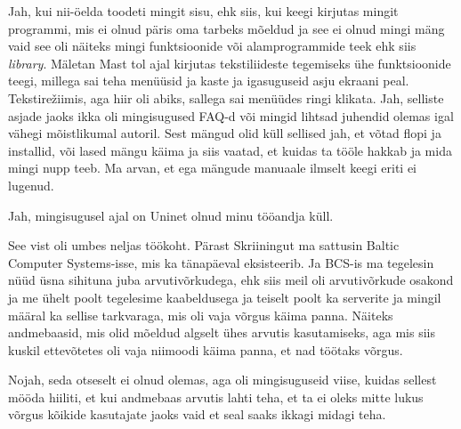 Jah, kui nii-öelda toodeti mingit sisu, ehk siis, kui keegi kirjutas mingit 
programmi, mis ei olnud  päris oma tarbeks mõeldud ja see ei olnud mingi mäng 
vaid see oli näiteks mingi funktsioonide või alamprogrammide teek ehk siis 
\emph{library}. Mäletan Mast tol ajal kirjutas 
tekstiliideste tegemiseks ühe funktsioonide teegi, millega sai teha menüüsid ja 
kaste ja igasuguseid asju ekraani peal. Tekstirežiimis, aga hiir oli  abiks, 
sallega sai menüüdes ringi klikata. Jah, selliste asjade jaoks ikka oli 
mingisugused FAQ-d või mingid lihtsad juhendid olemas igal vähegi mõistlikumal 
autoril. Sest mängud olid küll sellised jah, et võtad flopi ja installid, või 
lased mängu käima ja siis vaatad, et kuidas ta tööle hakkab ja mida mingi nupp 
teeb. Ma arvan, et ega mängude manuaale ilmselt keegi eriti ei lugenud.


Jah, mingisugusel ajal on Uninet  olnud minu tööandja küll.


See vist oli umbes neljas töökoht. Pärast Skriiningut ma sattusin Baltic 
Computer Systems-isse, mis ka tänapäeval 
eksisteerib. Ja BCS-is ma tegelesin  nüüd üsna sihituna juba arvutivõrkudega, 
ehk siis meil oli arvutivõrkude osakond ja me  ühelt poolt tegelesime 
kaabeldusega ja teiselt poolt  ka serverite ja mingil määral ka sellise 
tarkvaraga, mis  oli vaja võrgus käima panna. Näiteks andmebaasid, mis olid 
mõeldud algselt ühes arvutis kasutamiseks, aga mis siis kuskil ettevõtetes oli 
vaja niimoodi käima panna, et nad töötaks võrgus. 


Nojah, seda otseselt ei olnud olemas, aga oli mingisuguseid viise, kuidas 
sellest mööda hiiliti, et  kui andmebaas arvutis lahti teha, et ta ei oleks 
mitte lukus võrgus kõikide kasutajate jaoks vaid et seal saaks ikkagi midagi 
teha. 


